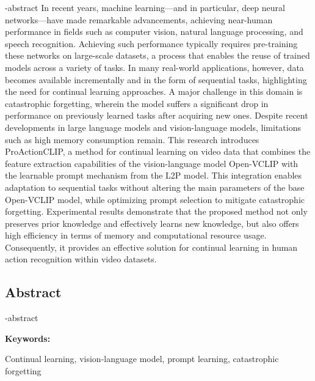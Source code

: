 
\en-abstract{
In recent years, machine learning—and in particular, deep neural networks—have made remarkable advancements, achieving near-human performance in fields such as computer vision, natural language processing, and speech recognition. Achieving such performance typically requires pre-training these networks on large-scale datasets, a process that enables the reuse of trained models across a variety of tasks. In many real-world applications, however, data becomes available incrementally and in the form of sequential tasks, highlighting the need for continual learning approaches. A major challenge in this domain is catastrophic forgetting, wherein the model suffers a significant drop in performance on previously learned tasks after acquiring new ones. Despite recent developments in large language models and vision-language models, limitations such as high memory consumption remain. This research introduces ProActionCLIP, a method for continual learning on video data that combines the feature extraction capabilities of the vision-language model Open-VCLIP with the learnable prompt mechanism from the L2P model. This integration enables adaptation to sequential tasks without altering the main parameters of the base Open-VCLIP model, while optimizing prompt selection to mitigate catastrophic forgetting. Experimental results demonstrate that the proposed method not only preserves prior knowledge and effectively learns new knowledge, but also offers high efficiency in terms of memory and computational resource usage. Consequently, it provides an effective solution for continual learning in human action recognition within video datasets.
}

\newpage
\thispagestyle{empty}
\begin{latin}
\section*{\LARGE\centering Abstract}

\een-abstract

\vspace*{.5cm}
{\large\textbf{Keywords:}}\par
\vspace*{.5cm}
Continual learning, vision-language model, prompt learning, catastrophic forgetting
\end{latin}